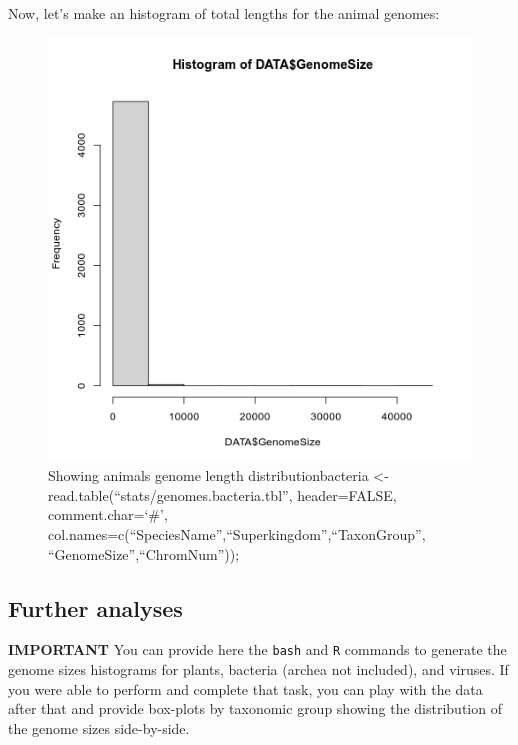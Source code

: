 \documentclass[10pt,a4paper,]{article}
\newenvironment{Shaded}{}{}
\newcommand{\DataTypeTok}[1]{\textcolor[rgb]{0.56,0.13,0.00}{#1}}
\newcommand{\KeywordTok}[1]{\textcolor[rgb]{0.00,0.44,0.13}{\textbf{#1}}}
\newcommand{\NormalTok}[1]{#1}
\newcommand{\OperatorTok}[1]{\textcolor[rgb]{0.40,0.40,0.40}{#1}}
\newcommand{\StringTok}[1]{\textcolor[rgb]{0.25,0.44,0.63}{#1}}
\begin{document}
Now, let's make an histogram of total lengths for the animal genomes:

\begin{Shaded}
\end{Shaded}

\begin{figure}
\centering
\includegraphics{images/genome_length_animals.png}
\caption{Showing animals genome length distributionbacteria \textless-
read.table(``stats/genomes.bacteria.tbl'', header=FALSE,
comment.char=`\#',
col.names=c(``SpeciesName'',``Superkingdom'',``TaxonGroup'',
``GenomeSize'',``ChromNum''));}
\end{figure}

\hypertarget{further-analyses}{%
\subsection{Further analyses}\label{further-analyses}}

\textbf{IMPORTANT} You can provide here the \texttt{bash} and \texttt{R}
commands to generate the genome sizes histograms for plants, bacteria
(archea not included), and viruses. If you were able to perform and
complete that task, you can play with the data after that and provide
box-plots by taxonomic group showing the distribution of the genome
sizes side-by-side.
\end{document}
